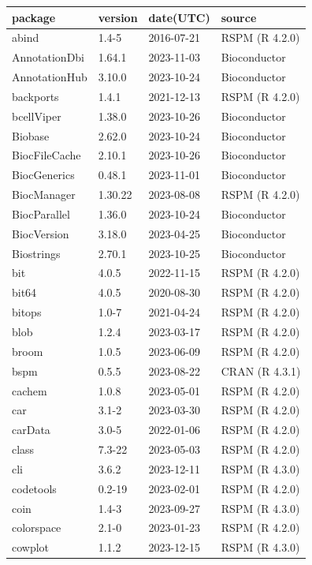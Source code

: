 \documentclass[]{article}
\begin{document}
\begin{longtable}[t]{llll}
\toprule
package & version & date(UTC) & source\\
\midrule
abind & 1.4-5 & 2016-07-21 & RSPM (R 4.2.0)\\
AnnotationDbi & 1.64.1 & 2023-11-03 & Bioconductor\\
AnnotationHub & 3.10.0 & 2023-10-24 & Bioconductor\\
backports & 1.4.1 & 2021-12-13 & RSPM (R 4.2.0)\\
bcellViper & 1.38.0 & 2023-10-26 & Bioconductor\\
\addlinespace
Biobase & 2.62.0 & 2023-10-24 & Bioconductor\\
BiocFileCache & 2.10.1 & 2023-10-26 & Bioconductor\\
BiocGenerics & 0.48.1 & 2023-11-01 & Bioconductor\\
BiocManager & 1.30.22 & 2023-08-08 & RSPM (R 4.2.0)\\
BiocParallel & 1.36.0 & 2023-10-24 & Bioconductor\\
\addlinespace
BiocVersion & 3.18.0 & 2023-04-25 & Bioconductor\\
Biostrings & 2.70.1 & 2023-10-25 & Bioconductor\\
bit & 4.0.5 & 2022-11-15 & RSPM (R 4.2.0)\\
bit64 & 4.0.5 & 2020-08-30 & RSPM (R 4.2.0)\\
bitops & 1.0-7 & 2021-04-24 & RSPM (R 4.2.0)\\
\addlinespace
blob & 1.2.4 & 2023-03-17 & RSPM (R 4.2.0)\\
broom & 1.0.5 & 2023-06-09 & RSPM (R 4.2.0)\\
bspm & 0.5.5 & 2023-08-22 & CRAN (R 4.3.1)\\
cachem & 1.0.8 & 2023-05-01 & RSPM (R 4.2.0)\\
car & 3.1-2 & 2023-03-30 & RSPM (R 4.2.0)\\
\addlinespace
carData & 3.0-5 & 2022-01-06 & RSPM (R 4.2.0)\\
class & 7.3-22 & 2023-05-03 & RSPM (R 4.2.0)\\
cli & 3.6.2 & 2023-12-11 & RSPM (R 4.3.0)\\
codetools & 0.2-19 & 2023-02-01 & RSPM (R 4.2.0)\\
coin & 1.4-3 & 2023-09-27 & RSPM (R 4.3.0)\\
\addlinespace
colorspace & 2.1-0 & 2023-01-23 & RSPM (R 4.2.0)\\
cowplot & 1.1.2 & 2023-12-15 & RSPM (R 4.3.0)\\

\end{longtable}
\end{document}
